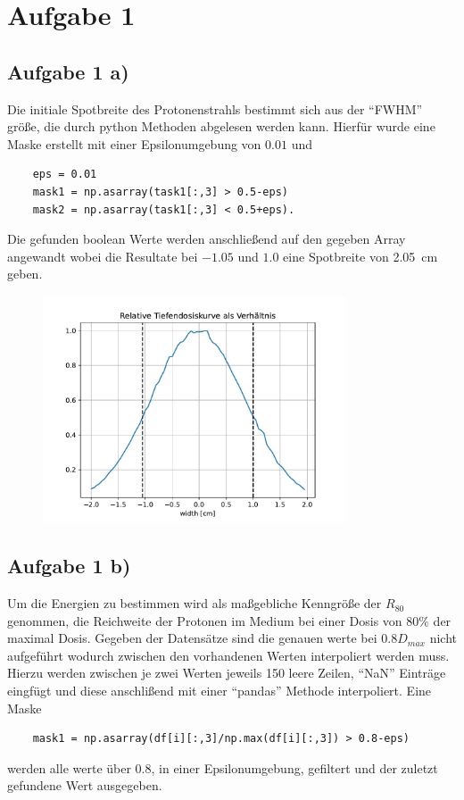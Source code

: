 \section{Aufgabe 1}
\subsection{Aufgabe 1 a)}
Die initiale Spotbreite des Protonenstrahls bestimmt sich aus der \enquote{FWHM} größe, die durch python Methoden abgelesen werden kann.
Hierfür wurde eine Maske erstellt mit einer Epsilonumgebung von $0.01$ und
\begin{verbatim}
    eps = 0.01
    mask1 = np.asarray(task1[:,3] > 0.5-eps)
    mask2 = np.asarray(task1[:,3] < 0.5+eps).
\end{verbatim}
Die gefunden boolean Werte werden anschließend auf den gegeben Array angewandt wobei die Resultate bei $-1.05$ und $1.0$ eine Spotbreite von \SI{2.05}{\cm} geben.
\begin{figure}
    \includegraphics[width = 0.8\textwidth]{../poject/task1/task1a.pdf}
\end{figure}
\noindent
\subsection{Aufgabe 1 b)}
Um die Energien zu bestimmen wird als maßgebliche Kenngröße der $R_{80}$ genommen, die Reichweite der Protonen 
im Medium bei einer Dosis von $80\%$ der maximal Dosis. Gegeben der Datensätze sind die genauen werte bei $0.8 D_{max}$ nicht aufgeführt wodurch zwischen den 
vorhandenen Werten interpoliert werden muss. Hierzu werden zwischen je zwei Werten jeweils 150 leere Zeilen, \enquote{NaN} Einträge eingfügt und diese anschlißend mit einer 
\enquote{pandas} Methode interpoliert. Eine Maske
\begin{verbatim}
    mask1 = np.asarray(df[i][:,3]/np.max(df[i][:,3]) > 0.8-eps)
\end{verbatim}
werden alle werte über 0.8, in einer Epsilonumgebung, gefiltert und der zuletzt gefundene Wert ausgegeben. 

